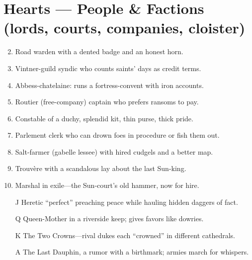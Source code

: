 \section*{Hearts --- People \& Factions (lords, courts, companies, cloister)}
\label{sec:vhasia-people}
\begin{enumerate}
\setcounter{enumi}{1}
\item Road warden with a dented badge and an honest horn.
\item Vintner-guild syndic who counts saints' days as credit terms.
\item Abbess-chatelaine: runs a fortress-convent with iron accounts.
\item Routier (free-company) captain who prefers ransoms to pay.
\item Constable of a duchy, splendid kit, thin purse, thick pride.
\item Parlement clerk who can drown foes in procedure or fish them out.
\item Salt-farmer (gabelle lessee) with hired cudgels and a better map.
\item Trouvère with a scandalous lay about the last Sun-king.
\item Marshal in exile---the Sun-court's old hammer, now for hire.
\item[J] Heretic ``perfect'' preaching peace while hauling hidden daggers of fact.
\item[Q] Queen-Mother in a riverside keep; gives favors like dowries.
\item[K] The Two Crowns---rival dukes each ``crowned'' in different cathedrals.
\item[A] The Last Dauphin, a rumor with a birthmark; armies march for whispers.
\end{enumerate}

